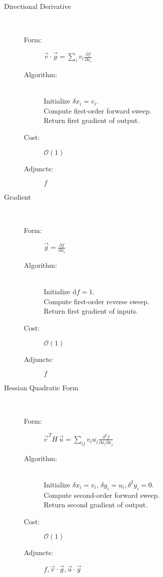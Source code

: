 \begin{description}
	
	\item[Directional Derivative] \hfill \\
	
	\begin{description}
		\item[Form:] $\displaystyle \vec{v} \cdot \vec{g} = \sum_{i} v_{i} \frac{ \partial f }{ \partial x_{i} } $
		\item[Algorithm:] \hfill \\
		Initialize $\delta x_{i} = v_{i}$. \\
		Compute first-order forward sweep. \\
		Return first gradient of output.
		\item[Cost:] $\mathcal{O} \! \left( 1 \right)$
		\item[Adjuncts:] $ f $
	\end{description}

	\item[Gradient] \hfill \\
	\begin{description}
		\item[Form:] $\displaystyle \vec{g} = \frac{ \partial f }{ \partial x_{i} } $
		\item[Algorithm:] \hfill \\
		Initialize $\mathrm{d} f = 1$. \\
		Compute first-order reverse sweep. \\
		Return first gradient of inputs.
		\item[Cost:] $\mathcal{O} \! \left( 1 \right)$
		\item[Adjuncts:] $ f $
	\end{description}
	
	\item[Hessian Quadratic Form] \hfill \\
	\begin{description}
		\item[Form:] 
		$\displaystyle \vec{v\,}^{T} H \, \vec{u} = \sum_{ij} v_{i} u_{j} \frac{ \partial^{2} f }{ \partial x_{i} \partial x_{j} } $
		\item[Algorithm:] \hfill \\
		Initialize $\delta x_{i} = v_{i}, \, \delta y_{i} = u_{i}, \delta^{2} y_{i} = 0$. \\
		Compute second-order forward sweep. \\
		Return second gradient of output.
		\item[Cost:] $\mathcal{O} \! \left( 1 \right)$
		\item[Adjuncts:] $ f, \vec{v} \cdot \vec{g}, \vec{u} \cdot \vec{g}$
	\end{description}
	

\end{description}
